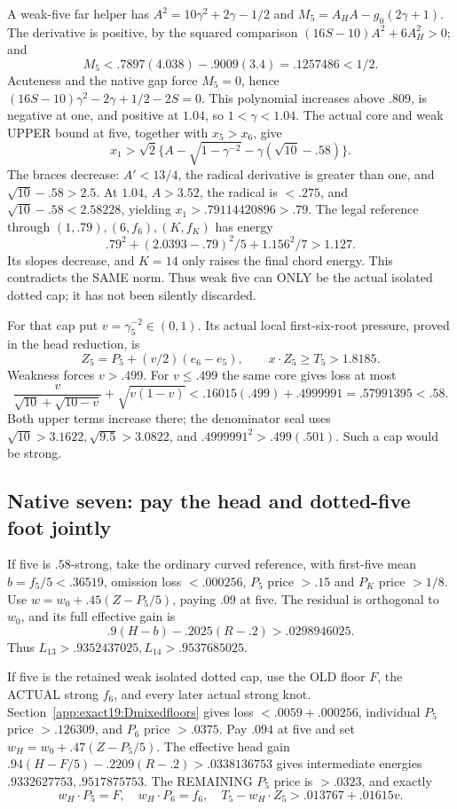 \documentclass[11pt]{article}
\theoremstyle{definition}
\theoremstyle{remark}
\begin{document}
A weak-five far helper has
\(A^2=10\gamma^2+2\gamma-1/2\) and
\(M_5=A_HA-g_0(2\gamma+1)\).
The derivative is positive, by the squared comparison
\((16S-10)A^2+6A_H^2>0\); and
\[
                         M_5<.7897(4.038)-.9009(3.4)=.1257486<1/2 .
\]
Acuteness and the native gap force \(M_5=0\), hence
\((16S-10)\gamma^2-2\gamma+1/2-2S=0\).
This polynomial increases above \(.809\), is negative at one, and
positive at \(1.04\), so \(1<\gamma<1.04\).
The actual core and weak UPPER bound at five, together with \(x_5>x_6\),
give
\[
 x_1>\sqrt2\{A-\sqrt{1-\gamma^{-2}}-\gamma(\sqrt{10}-.58)\}.
\]
The braces decrease: \(A'<13/4\), the radical derivative is greater
than one, and \(\sqrt{10}-.58>2.5\).
At \(1.04\), \(A>3.52\), the radical is \(<.275\), and
\(\sqrt{10}-.58<2.58228\), yielding \(x_1>.79114420896>.79\).
The legal reference through \((1,.79),(6,f_6),(K,f_K)\) has energy
\[
             .79^2+(2.0393-.79)^2/5+1.156^2/7>1.127 .
\]
Its slopes decrease, and \(K=14\) only raises the final chord energy.
This contradicts the SAME norm. Thus weak five can ONLY be the actual
isolated dotted cap; it has not been silently discarded.

For that cap put \(v=\gamma_5^{-2}\in(0,1)\).
Its actual local first-six-root pressure, proved in the head reduction,
is
\[
 Z_5=P_5+(v/2)(e_6-e_5),\qquad x\cdot Z_5\ge T_5>1.8185 .
\]
Weakness forces \(v>.499\).
For \(v\le.499\) the same core gives loss at most
\[
 \frac{v}{\sqrt{10}+\sqrt{10-v}}+\sqrt{v(1-v)}
       <.16015(.499)+.4999991=.57991395<.58 .
\]
Both upper terms increase there; the denominator seal uses
\(\sqrt{10}>3.1622,\sqrt{9.5}>3.0822\), and
\(.4999991^2>.499(.501)\). Such a cap would be strong.

\subsection{Native seven: pay the head and dotted-five foot jointly}
\label{app:exact19:Dsevenreference}

If five is \(.58\)-strong, take the ordinary curved reference, with
first-five mean \(b=f_5/5<.36519\), omission loss \(<.000256\),
\(P_5\) price \(>.15\) and \(P_K\) price \(>1/8\).
Use \(w=w_0+.45(Z-P_5/5)\), paying \(.09\) at five.
The residual is orthogonal to \(w_0\), and its full effective gain is
\[
                  .9(H-b)-.2025(R-.2)>.0298946025 .
\]
Thus \(L_{13}>.9352437025,L_{14}>.9537685025\).

If five is the retained weak isolated dotted cap, use the OLD floor
\(F\), the ACTUAL strong \(f_6\), and every later actual strong knot.
Section~\ref{app:exact19:Dmixedfloors} gives loss \(<.0059+.000256\),
individual \(P_5\) price \(>.126309\), and \(P_6\) price \(>.0375\).
Pay \(.094\) at five and set \(w_H=w_0+.47(Z-P_5/5)\).
The effective head gain
\(.94(H-F/5)-.2209(R-.2)>.0338136753\)
gives intermediate energies \(.9332627753,.9517875753\).
The REMAINING \(P_5\) price is \(>.0323\), and exactly
\[
 w_H\cdot P_5=F,\quad w_H\cdot P_6=f_6,\quad
                T_5-w_H\cdot Z_5>.013767+.01615v .
\]
\end{document}
